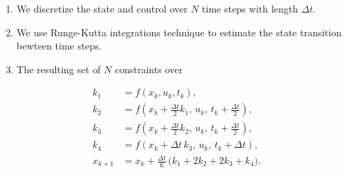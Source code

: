 \documentclass[]{article}
\begin{document}
\begin{enumerate}
	\item We discretize the state and control over $N$ time steps with length $\Delta t$.
	\item We use Runge-Kutta integrations technique to estimate the state transition bewteen time steps.
	\item The resulting set of $N$ constraints over 
\end{enumerate}
	\[
        \begin{aligned}
        k_1 &= f(x_k, u_k, t_k), \\[6pt]
        k_2 &= f\!\left(x_k + \tfrac{\Delta t}{2} k_1,\, u_k,\, t_k + \tfrac{\Delta t}{2}\right), \\[6pt]
        k_3 &= f\!\left(x_k + \tfrac{\Delta t}{2} k_2,\, u_k,\, t_k + \tfrac{\Delta t}{2}\right), \\[6pt]
        k_4 &= f\!\left(x_k + \Delta t\, k_3,\, u_k,\, t_k + \Delta t\right), \\[10pt]
        x_{k+1} &= x_k + \tfrac{\Delta t}{6}\,\Big(k_1 + 2k_2 + 2k_3 + k_4\Big).
        \end{aligned}
        \]
\end{document}
